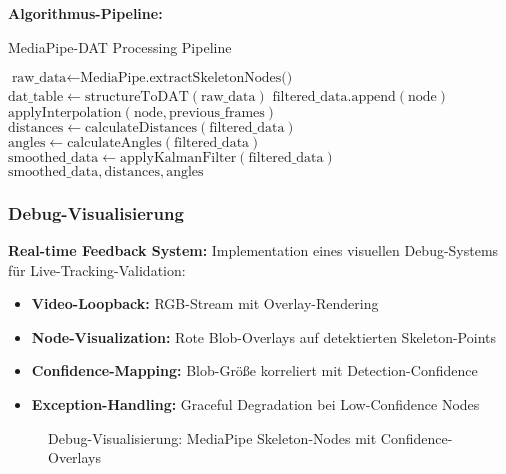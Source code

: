 \textbf{Algorithmus-Pipeline:}

\begin{algorithm}[H]
\caption{MediaPipe-DAT Processing Pipeline}\label{alg:mediapipe_dat}
\begin{algorithmic}[1]
    \State $\text{raw\_data} \leftarrow \text{MediaPipe.extractSkeletonNodes()}$
    \State $\text{dat\_table} \leftarrow \text{structureToDAT}(\text{raw\_data})$
            \State $\text{filtered\_data.append}(\text{node})$
        \Else
            \State $\text{applyInterpolation}(\text{node}, \text{previous\_frames})$
        \EndIf
    \EndFor
    \State $\text{distances} \leftarrow \text{calculateDistances}(\text{filtered\_data})$
    \State $\text{angles} \leftarrow \text{calculateAngles}(\text{filtered\_data})$
    \State $\text{smoothed\_data} \leftarrow \text{applyKalmanFilter}(\text{filtered\_data})$
    \Return $\text{smoothed\_data}, \text{distances}, \text{angles}$
\end{algorithmic}
\end{algorithm}

\subsubsection{Debug-Visualisierung}

\textbf{Real-time Feedback System:}
Implementation eines visuellen Debug-Systems für Live-Tracking-Validation:

\begin{itemize}
    \item \textbf{Video-Loopback:} RGB-Stream mit Overlay-Rendering
    \item \textbf{Node-Visualization:} Rote Blob-Overlays auf detektierten Skeleton-Points
    \item \textbf{Confidence-Mapping:} Blob-Größe korreliert mit Detection-Confidence
    \item \textbf{Exception-Handling:} Graceful Degradation bei Low-Confidence Nodes
\end{itemize}

\begin{figure}[H]
    \centering
    \caption{Debug-Visualisierung: MediaPipe Skeleton-Nodes mit Confidence-Overlays}
    \label{fig:debug_viz}
\end{figure}

